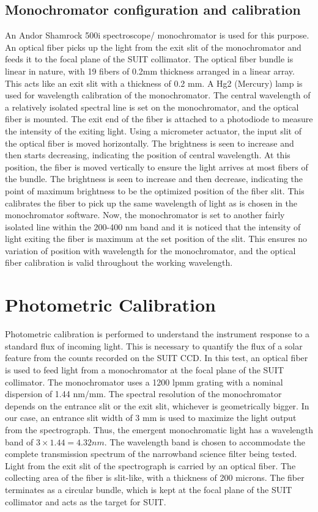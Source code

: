 \documentclass[12pt]{spieman}  %
\begin{document}
	\subsection{Monochromator configuration and calibration}
	An Andor Shamrock 500i spectroscope/ monochromator is used for this purpose. An optical fiber picks up the light from the exit slit of the monochromator and feeds it to the focal plane of the SUIT collimator. The optical fiber bundle is linear in nature, with 19 fibers of 0.2mm thickness arranged in a linear array. This acts like an exit slit with a thickness of 0.2 mm. A Hg2 (Mercury) lamp is used for wavelength calibration of the monochromator. The central wavelength of a relatively isolated spectral line is set on the monochromator, and the optical fiber is mounted. The exit end of the fiber is attached to a photodiode to measure the intensity of the exiting light. Using a micrometer actuator, the input slit of the optical fiber is moved horizontally. The brightness is seen to increase and then starts decreasing, indicating the position of central wavelength. At this position, the fiber is moved vertically to ensure the light arrives at most fibers of the bundle. The brightness is seen to increase and then decrease, indicating the point of maximum brightness to be the optimized position of the fiber slit. This calibrates the fiber to pick up the same wavelength of light as is chosen in the monochromator software. Now, the monochromator is set to another fairly isolated line within the 200-400 nm band and it is noticed that the intensity of light exiting the fiber is maximum at the set position of the slit. This ensures no variation of position with wavelength for the monochromator, and the optical fiber calibration is valid throughout the working wavelength.
	
	\section{Photometric Calibration}
	Photometric calibration is performed to understand the instrument response to a standard flux of incoming light. This is necessary to quantify the flux of a solar feature from the counts recorded on the SUIT CCD. In this test, an optical fiber is used to feed light from a monochromator at the focal plane of the SUIT collimator. The monochromator uses a 1200 lpmm grating with a nominal dispersion of 1.44 nm/mm. The spectral resolution of the monochromator depends on the entrance slit or the exit slit, whichever is geometrically bigger. In our case, an entrance slit width of 3 mm is used to maximize the light output from the spectrograph. Thus, the emergent monochromatic light has a wavelength band of $3\times 1.44 = 4.32 nm$. The wavelength band is chosen to accommodate the complete transmission spectrum of the narrowband science filter being tested. Light from the exit slit of the spectrograph is carried by an optical fiber. The collecting area of the fiber is slit-like, with a thickness of 200 microns. The fiber terminates as a circular bundle, which is kept at the focal plane of the SUIT collimator and acts as the target for SUIT.
	
\end{document}
